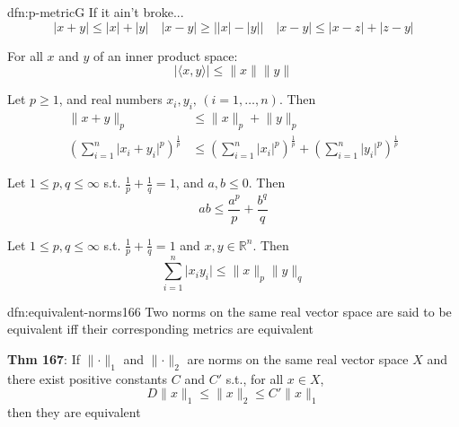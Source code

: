 \documentclass[landscape, 8pt]{extarticle}
\begin{document}
\begin{multicols}{3}
\begin{thm}{dfn:p-metric}{G}
    If it ain't broke...
    \[\lvert x + y \rvert \le \lvert x \rvert + \lvert y \rvert \quad \lvert x - y \rvert \ge \big\lvert \lvert x \rvert - \lvert y \rvert \big\rvert \quad \lvert x - y \rvert \le \lvert x - z \rvert + \lvert z - y \rvert\]


    For all $x$ and $y$ of an inner product space:
    \[\lvert \langle x, y \rangle \rvert \le \lVert x \rVert \lVert y \rVert\]


    Let $p \ge 1$, and real numbers $x_{i}, y_{i},\,(i = 1,\dots,n)$. Then
    \begin{align*}
        \lVert x + y \rVert_{p} &\le \lVert x \rVert_{p} + \lVert y \rVert_{p} \\
        \left(\sum_{i = 1}^{n} \lvert x_{i} + y_{i} \rvert^{p}\right)^{\frac{1}{p}} &\le \left(\sum_{i = 1}^{n} \lvert x_{i} \rvert^{p}\right)^{\frac{1}{p}} + \left(\sum_{i = 1}^{n} \lvert y_{i} \rvert^{p}\right)^{\frac{1}{p}}
    \end{align*}

    
    Let $1 \le p, q \le \infty$ s.t. $\frac{1}{p} + \frac{1}{q} = 1$, and $a, b\le 0$. Then
    \[ab \le \frac{a^{p}}{p} + \frac{b^{q}}{q}\]


    Let $1 \le p, q \le \infty$ s.t. $\frac{1}{p} + \frac{1}{q} = 1$ and $x, y\in \mathbb{R}^{n}$. Then
    \[\sum_{i = 1}^{n} \lvert x_{i}y_{i} \rvert \le \lVert x \rVert_{p} \lVert y \rVert_{q}\]

\end{thm}


\begin{dfn}{dfn:equivalent-norms}{166}
    \vspace{-5pt}
    Two norms on the same real vector space are said to be equivalent iff their corresponding metrics are equivalent

    \longrule{0.08ex}
    \textbf{Thm 167}: If $\lVert \cdot \rVert_{1}$ and $\lVert \cdot \rVert_{2}$ are norms on the same real vector space $X$ and there exist positive constants $C$ and $C'$ s.t., for all $x\in X$,
    \[D \lVert x \rVert_{1} \le \lVert x \rVert_{2} \le C' \lVert x \rVert_{1}\]
    then they are equivalent



\end{dfn}
\end{multicols}
\end{document}
